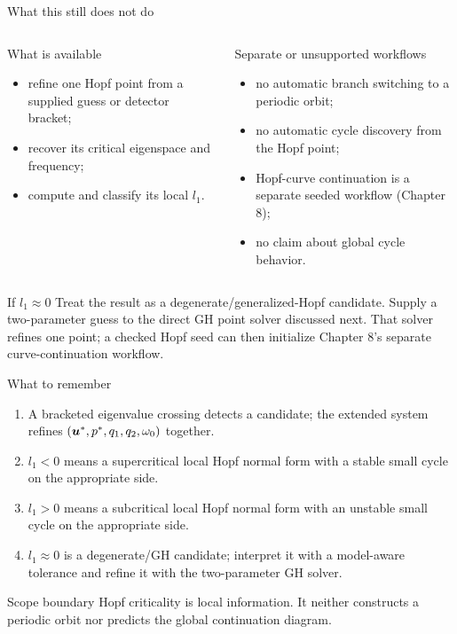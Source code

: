 \begin{frame}{What this still does not do}
\begin{columns}[T]
\begin{block}{What is available}
\begin{itemize}
  \item refine one Hopf point from a supplied guess or detector bracket;
  \item recover its critical eigenspace and frequency;
  \item compute and classify its local $l_1$.
\end{itemize}
\end{block}
\begin{alertblock}{Separate or unsupported workflows}
\begin{itemize}
  \item no automatic branch switching to a periodic orbit;
  \item no automatic cycle discovery from the Hopf point;
  \item Hopf-curve continuation is a separate seeded workflow (Chapter 8);
  \item no claim about global cycle behavior.
\end{itemize}
\end{alertblock}
\end{columns}
\begin{block}{If $l_1\approx0$}
Treat the result as a degenerate/generalized-Hopf candidate. Supply a
two-parameter guess to the direct GH point solver discussed next. That solver
refines one point; a checked Hopf seed can then initialize Chapter 8's separate
curve-continuation workflow.
\end{block}
\end{frame}

\begin{frame}{What to remember}
\begin{enumerate}
  \item A bracketed eigenvalue crossing detects a candidate; the extended
        system refines $(\bm{u}^*,p^*,q_1,q_2,\omega_0)$ together.
  \item $l_1<0$ means a supercritical local Hopf normal form with a stable
        small cycle on the appropriate side.
  \item $l_1>0$ means a subcritical local Hopf normal form with an unstable
        small cycle on the appropriate side.
  \item $l_1\approx0$ is a degenerate/GH candidate; interpret it with a
        model-aware tolerance and refine it with the two-parameter GH solver.
\end{enumerate}
\vspace{3mm}
\begin{alertblock}{Scope boundary}
Hopf criticality is local information. It neither constructs a periodic
orbit nor predicts the global continuation diagram.
\end{alertblock}
\end{frame}
